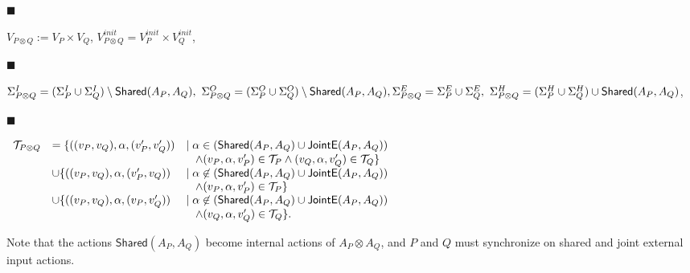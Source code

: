 \par\noindent  $\blacksquare$ 
 
$V_{P\otimes Q}:=V_{P}\times V_{Q}$, $V_{P\otimes Q}^{init}=V_{P}^{init}\times V_{Q}^{init}$,\par
 
 
 
\par\noindent  $\blacksquare$ 
 
$\Sigma_{P\otimes Q}^{I}=(\Sigma_{P}^{I}\cup\Sigma_{Q}^{I})\setminus\mathsf{Shared}(A_{P},A_{Q}),\ \Sigma_{P\otimes Q}^{O}=(\Sigma_{P}^{O}\cup\Sigma_{Q}^{O})\setminus\mathsf{Shared}(A_{P},A_{Q}),\\
\Sigma_{P\otimes Q}^{E}=\Sigma_{P}^{E}\cup\Sigma_{Q}^{E},\ \Sigma_{P\otimes Q}^{H}=(\Sigma_{P}^{H}\cup\Sigma_{Q}^{H})\cup\mathsf{Shared}(A_{P},A_{Q})$,\par
 
 
 
\par\noindent  $\blacksquare$ 
 
$\begin{array}[]{lll}\mathcal{T}_{P\otimes Q}&=\{((v_{P},v_{Q}),\alpha,(v_{P}^{\prime},v_{Q}^{\prime}))&\mid\alpha\in(\mathsf{Shared}(A_{P},A_{Q})\cup\mathsf{JointE}(A_{P},A_{Q}))\\
&&\;\;\;\land(v_{P},\alpha,v_{P}^{\prime})\in\mathcal{T}_{P}\land(v_{Q},\alpha,v_{Q}^{\prime})\in\mathcal{T}_{Q}\}\\
&\cup\{((v_{P},v_{Q}),\alpha,(v_{P}^{\prime},v_{Q}))&\mid\alpha\not\in(\mathsf{Shared}(A_{P},A_{Q})\cup\mathsf{JointE}(A_{P},A_{Q}))\\
&&\;\;\;\land(v_{P},\alpha,v_{P}^{\prime})\in\mathcal{T}_{P}\}\\
&\cup\{((v_{P},v_{Q}),\alpha,(v_{P},v_{Q}^{\prime}))&\mid\alpha\not\in(\mathsf{Shared}(A_{P},A_{Q})\cup\mathsf{JointE}(A_{P},A_{Q}))\\
&&\;\;\;\land(v_{Q},\alpha,v_{Q}^{\prime})\in\mathcal{T}_{Q}\}.\end{array}$\par
 
 
  
 
 
 
Note that the actions $\mathsf{Shared}(A_{P},A_{Q})$ become internal actions of $A_{P}\otimes A_{Q}$, and $P$ and $Q$ must synchronize on shared and joint external input actions.\par
 
